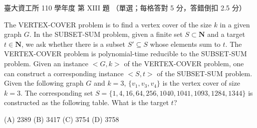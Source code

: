 \begin{pastexam}[label={px:ntu-110-dsaa-13}]{臺大資工所 110 學年度 第 XIII 題}
（單選；每格答對 5 分，答錯倒扣 2.5 分）

The VERTEX-COVER problem is to find a vertex cover of the size $k$ in a given graph $G$. In the
SUBSET-SUM problem, given a finite set $S\subset\mathbf{N}$ and a target $t\in\mathbf{N}$, we ask
whether there is a subset $S'\subseteq S$ whose elements sum to $t$. The VERTEX-COVER problem is
polynomial-time reducible to the SUBSET-SUM problem. Given an instance $<G,k>$ of the
VERTEX-COVER problem, one can construct a corresponding instance $<S,t>$ of the SUBSET-SUM
problem. Given the following graph $G$ and $k=3$, $\{v_1,v_3,v_4\}$ is the vertex cover of size
$k=3$. The corresponding set $S=\{1,4,16,64,256,1040,1041,1093,1284,1344\}$ is constructed as the
following table. What is the target $t$? \underline{}

(A) 2389 \qquad (B) 3417 \qquad (C) 3754 \qquad (D) 3758


\end{pastexam}
